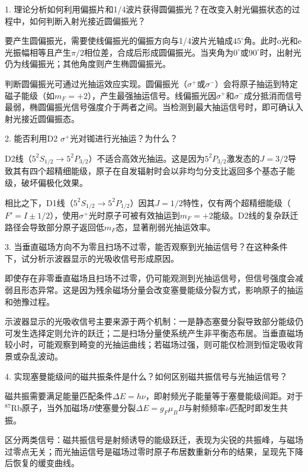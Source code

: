 \clearpage


\begin{question}
1. 理论分析如何利用偏振片和1/4波片获得圆偏振光？在改变入射光偏振状态的过程中，如何判断入射光接近圆偏振光？
\end{question}


要产生圆偏振光，需要使线偏振光的偏振方向与1/4波片光轴成$45^\circ$角。此时o光和e光振幅相等且产生$\pi/2$相位差，合成后形成圆偏振光。当夹角为$0^\circ$或$90^\circ$时，出射光仍为线偏振光；其他角度则产生椭圆偏振光。

判断圆偏振光可通过光抽运效应实现。圆偏振光（$\sigma^+$或$\sigma^-$）会将原子抽运到特定磁子能级（如$m_F=+2$），产生最强抽运信号。线偏振光因$\sigma^+$和$\sigma^-$成分抵消而信号最弱，椭圆偏振光信号强度介于两者之间。当检测到最大抽运信号时，即可确认入射光接近圆偏振态。

\begin{question}
2. 能否利用D2 $\sigma^+$光对铷进行光抽运？为什么？
\end{question}


D2线（$5^2S_{1/2}\rightarrow5^2P_{3/2}$）不适合高效光抽运。这是因为$5^2P_{3/2}$激发态的$J=3/2$导致其有四个超精细能级，原子在自发辐射时会以非均匀分支比返回多个基态子能级，破坏偏极化效果。

相比之下，D1线（$5^2S_{1/2}\rightarrow5^2P_{1/2}$）因其$J=1/2$特性，仅有两个超精细能级（$F'=I\pm1/2$），使用$\sigma^+$光时原子可被有效抽运到$m_F=+2$能级。D2线的复杂跃迁路径会导致部分原子返回低$m_F$态，显著削弱光抽运效率。


\begin{question}
3. 当垂直磁场方向不为零且扫场不过零，能否观察到光抽运信号？在这种条件下，试分析示波器显示的光吸收信号形成原因。
\end{question}


即使存在非零垂直磁场且扫场不过零，仍可能观测到光抽运信号，但信号强度会减弱且形态异常。这是因为残余磁场分量会改变塞曼能级分裂方式，影响原子的抽运和弛豫过程。

示波器显示的光吸收信号主要来源于两个机制：一是静态塞曼分裂导致部分能级仍可发生选择定则允许的跃迁；二是扫场分量使系统产生非平衡态布居。当垂直磁场较小时，可能观察到畸变的光抽运曲线；若磁场过强，则可能仅检测到恒定吸收背景或杂乱波动。


\begin{question}
4. 实现塞曼能级间的磁共振条件是什么？如何区别磁共振信号与光抽运信号？
\end{question}


磁共振需要满足能量匹配条件$\Delta E = h\nu$，即射频光子能量等于塞曼能级间距。对于$^{87}$Rb原子，当外加磁场$B$使塞曼分裂$\Delta E=g_F\mu_B B$与射频频率$\nu$匹配时即发生共振。

区分两类信号：磁共振信号是射频诱导的能级跃迁，表现为尖锐的共振峰，与磁场过零点无关；而光抽运信号是磁场过零时原子布居数重新分布的结果，呈现先下降后恢复的缓变曲线。






